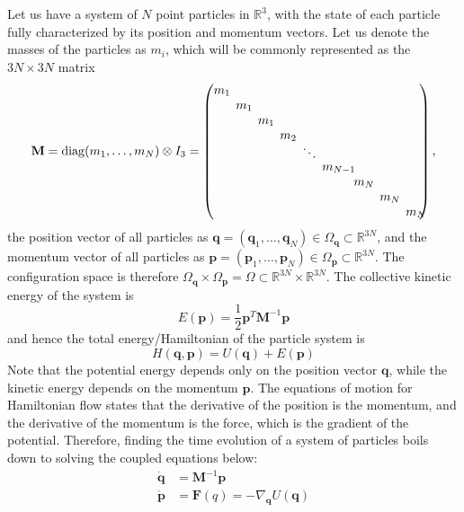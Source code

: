 \documentclass{article}
\begin{document}
    Let us have a system of $N$ point particles in $\mathbb{R}^3$, with the state of each particle fully characterized by its position and momentum vectors. Let us denote the masses of the particles as $m_i$, which will be commonly represented as the $3N \times 3N$ matrix  
    \[\mathbf{M} = \mathrm{diag}(m_1, \ldots, m_N) \otimes I_3 = \begin{pmatrix}
    m_1\hspace{-2mm}& & & & & & & & \\ 
    & m_1\hspace{-2mm}& & & & & & & \\ 
    & & m_1\hspace{-2mm}& & & & & & \\ 
    & & & m_2 \hspace{-2mm}& & & & & \\[-1mm] 
    & & & & \ddots \hspace{-2mm} & & & & \\[-1mm] 
    & & & & & m_{N-1}\hspace{-4mm} & & & \\ 
    & & & & & & m_N \hspace{-2mm}& & \\ 
    & & & & & & & m_N\hspace{-2mm} & \\ 
    & & & & & & & & m_N\hspace{-2mm} \end{pmatrix}, \]
    the position vector of all particles as $\mathbf{q} = (\mathbf{q}_1, \ldots, \mathbf{q}_N) \in \Omega_\mathbf{q} \subset \mathbb{R}^{3N}$, and the momentum vector of all particles as $\mathbf{p} = (\mathbf{p}_1, \ldots, \mathbf{p}_N) \in \Omega_\mathbf{p} \subset \mathbb{R}^{3N}$. The configuration space is therefore $\Omega_\mathbf{q} \times \Omega_\mathbf{p} = \Omega \subset \mathbb{R}^{3N} \times \mathbb{R}^{3N}$. The collective kinetic energy of the system is 
    \[E (\mathbf{p}) = \frac{1}{2} \mathbf{p}^T \mathbf{M}^{-1} \mathbf{p}\]
    and hence the total energy/Hamiltonian of the particle system is 
    \[H(\mathbf{q}, \mathbf{p}) = U(\mathbf{q}) + E(\mathbf{p})\]
    Note that the potential energy depends only on the position vector $\mathbf{q}$, while the kinetic energy depends on the momentum $\mathbf{p}$. The equations of motion for Hamiltonian flow states that the derivative of the position is the momentum, and the derivative of the momentum is the force, which is the gradient of the potential. Therefore, finding the time evolution of a system of particles boils down to solving the coupled equations below: 
    \begin{align*}
        \boldsymbol{\dot{q}} & = \mathbf{M}^{-1} \mathbf{p} \\
        \boldsymbol{\dot{p}} & = \mathbf{F}(q) = - \nabla_\mathbf{q} U(\mathbf{q})
    \end{align*}
\end{document}

